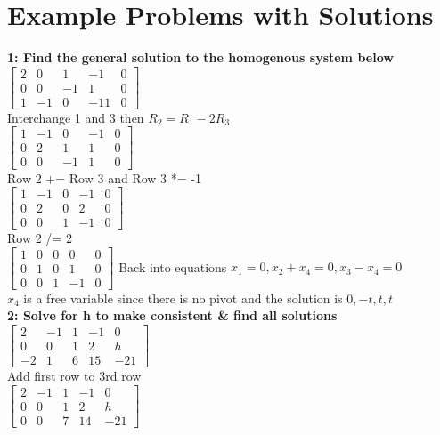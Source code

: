 \documentclass{article}
\begin{document}
\section{Example Problems with Solutions}
\textbf{1: Find the general solution to the homogenous system below}\\[0.1in]
$\left[\begin{array}{cccc|c}
2 & 0 & 1 & -1 & 0 \\
0 & 0 & -1 & 1 & 0 \\
1 & -1 & 0 & -11 & 0
\end{array}\right]$
\\[0.05in]Interchange 1 and 3 then $R_2 = R_1-2R_3$\\[0.05in]
$\left[\begin{array}{cccc|c}
1 & -1 & 0 & -1 & 0 \\
0 & 2 & 1 & 1 & 0 \\
0 & 0 & -1 & 1 & 0
\end{array}\right]$
\\[0.05in]Row 2 += Row 3 and Row 3 *= -1\\[0.05in]
$\left[\begin{array}{cccc|c}
1 & -1 & 0 & -1 & 0 \\
0 & 2 & 0 & 2 & 0 \\
0 & 0 & 1 & -1 & 0
\end{array}\right]$
\\[0.05in]Row 2 /= 2\\[0.05in]
$\left[\begin{array}{cccc|c}
1 & 0 & 0 & 0 & 0 \\
0 & 1 & 0 & 1 & 0 \\
0 & 0 & 1 & -1 & 0
\end{array}\right]$
Back into equations $x_1=0, x_2+x_4=0, x_3-x_4=0$ \\[0.05in]$x_4$ is a free variable since there is no pivot and the solution is $\boxed{0, -t, t, t}$\\
\textbf{2: Solve for h to make consistent \& find all solutions}\\[0.05in]
$\left[\begin{array}{cccc|c}
2 & -1 & 1 & -1 & 0 \\
0 & 0 & 1 & 2 & h \\
-2 & 1 & 6 & 15 & -21
\end{array}\right]$
\\[0.05in]Add first row to 3rd row\\[0.05in]
$\left[\begin{array}{cccc|c}
2 & -1 & 1 & -1 & 0 \\
0 & 0 & 1 & 2 & h \\
0 & 0 & 7 & 14 & -21
\end{array}\right]$
\end{document}
